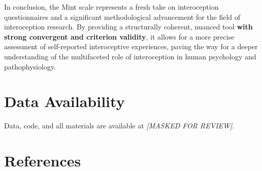 \documentclass[
  man,
  floatsintext,
  longtable,
  nolmodern,
  notxfonts,
  notimes,
  mask,
  colorlinks=true,linkcolor=blue,citecolor=blue,urlcolor=blue]{apa7}
\begin{document}
In conclusion, the Mint scale represents a fresh take on interoception
questionnaires and a significant methodological advancement for the
field of interoception research. By providing a structurally coherent,
nuanced tool \textbf{with strong convergent and criterion validity}, it
allows for a more precise assessment of self-reported interoceptive
experiences, paving the way for a deeper understanding of the
multifaceted role of interoception in human psychology and
pathophysiology.

\section{Data Availability}\label{data-availability}

Data, code, and all materials are available at \emph{{[}MASKED FOR
REVIEW{]}}.

\section{References}\label{references}
\end{document}
